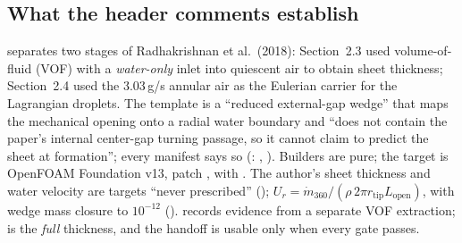\subsection{What the header comments establish}

  separates two stages of Radhakrishnan et al.\ (2018): Section~2.3 used volume-of-fluid (VOF) with a \emph{water-only} inlet into quiescent air to obtain sheet thickness; Section~2.4 used the 3.03\,g/s annular air as the Eulerian carrier for the Lagrangian droplets. The template is a ``reduced external-gap wedge'' that maps the mechanical opening onto a radial water boundary and ``does not contain the paper's internal center-gap turning passage, so it cannot claim to predict the sheet at formation''; every manifest says so (: , ). Builders are pure; the target is OpenFOAM Foundation v13, patch ,  with . The author's sheet thickness and water velocity are targets ``never prescribed'' (); $U_r=\dot m_{360}/(\rho\,2\pi r_{\text{tip}}L_{\text{open}})$, with wedge mass closure to $10^{-12}$ ().  records evidence from a separate VOF extraction;  is the \emph{full} thickness, and the handoff is usable only when every gate passes.

